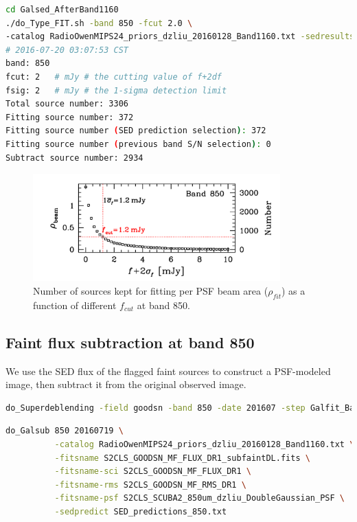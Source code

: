 \documentclass[11pt,a4paper]{article}
\begin{document}
\begin{lstlisting}[language=bash]
cd Galsed_AfterBand1160
./do_Type_FIT.sh -band 850 -fcut 2.0 \
-catalog RadioOwenMIPS24_priors_dzliu_20160128_Band1160.txt -sedresults ResLMT*.txt
# 2016-07-20 03:07:53 CST
band: 850
fcut: 2   # mJy # the cutting value of f+2df
fsig: 2   # mJy # the 1-sigma detection limit
Total source number: 3306
Fitting source number: 372
Fitting source number (SED prediction selection): 372
Fitting source number (previous band S/N selection): 0
Subtract source number: 2934
\end{lstlisting}

\begin{figure}[H]
	\caption{Number of sources kept for fitting per PSF beam area ($\rho_{fit}$) as a function of different $f_{cut}$ at band 850.}
	\includegraphics[width=0.85\textwidth]{plot_cutting_flux_850}
\end{figure}

\subsection{Faint flux subtraction at band 850}
\label{Band850_Galsub}

We use the SED flux of the flagged faint sources to construct a PSF-modeled image, then subtract it from the original observed image. 

\begin{lstlisting}[language=bash]
do_Superdeblending -field goodsn -band 850 -date 201607 -step Galfit_Band850 -catalog-input Galsed_AfterBand1160/RadioOwenMIPS24_priors_dzliu_20160128_Band1160.txt -sedpredict Galsed_AfterBand1160/do_Type_FIT/SED_predictions_850.txt -fitsname S2CLS_GOODS-N_MF_FLUX_DR1 -fitsname-rms S2CLS_GOODS-N_MF_RMS_DR1 -fitsname-psf S2CLS_SCUBA2_850um_dzliu_DoubleGaussian_PSF
\end{lstlisting}

\begin{lstlisting}[language=bash]
do_Galsub 850 20160719 \
          -catalog RadioOwenMIPS24_priors_dzliu_20160128_Band1160.txt \
          -fitsname S2CLS_GOODSN_MF_FLUX_DR1_subfaintDL.fits \
          -fitsname-sci S2CLS_GOODSN_MF_FLUX_DR1 \
          -fitsname-rms S2CLS_GOODSN_MF_RMS_DR1 \
          -fitsname-psf S2CLS_SCUBA2_850um_dzliu_DoubleGaussian_PSF \
          -sedpredict SED_predictions_850.txt
\end{lstlisting}
\end{document}
